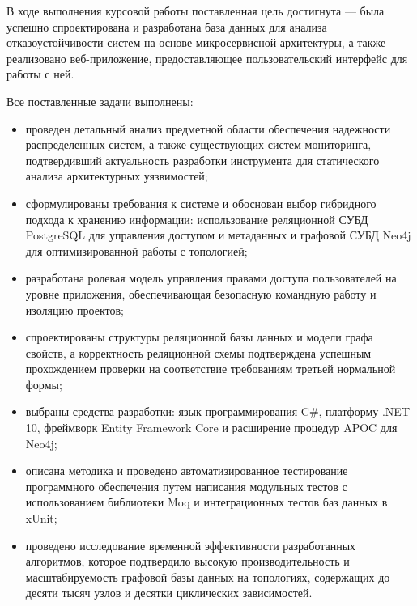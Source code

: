 В ходе выполнения курсовой работы поставленная цель достигнута --- 
была успешно спроектирована и разработана база данных для анализа 
отказоустойчивости систем на основе микросервисной архитектуры, а также 
реализовано веб-приложение, предоставляющее пользовательский 
интерфейс для работы с ней.

Все поставленные задачи выполнены:
\begin{itemize}
    \item проведен детальный анализ предметной области обеспечения надежности
    распределенных систем, а также существующих систем мониторинга, подтвердивший
    актуальность разработки инструмента для статического анализа архитектурных уязвимостей;
    \item сформулированы требования к системе и обоснован выбор
    гибридного подхода к хранению информации: использование реляционной СУБД
    PostgreSQL для управления доступом и метаданных и графовой СУБД Neo4j для
    оптимизированной работы с топологией;
    \item разработана ролевая модель управления правами доступа пользователей на
    уровне приложения, обеспечивающая безопасную командную работу и изоляцию проектов;
    \item спроектированы структуры реляционной базы данных и модели графа свойств, а
    корректность реляционной схемы подтверждена успешным прохождением проверки на
    соответствие требованиям третьей нормальной формы;
    \item выбраны средства разработки: язык программирования C\#,
    платформу .NET 10, фреймворк Entity Framework Core и расширение процедур APOC
    для Neo4j;
    \item описана методика и проведено автоматизированное тестирование программного
    обеспечения путем написания модульных тестов с использованием библиотеки Moq и
    интеграционных тестов баз данных в xUnit;
    \item проведено исследование временной эффективности разработанных
    алгоритмов, которое подтвердило высокую производительность и масштабируемость
    графовой базы данных на топологиях, содержащих до десяти тысяч узлов и десятки
    циклических зависимостей.
\end{itemize}
